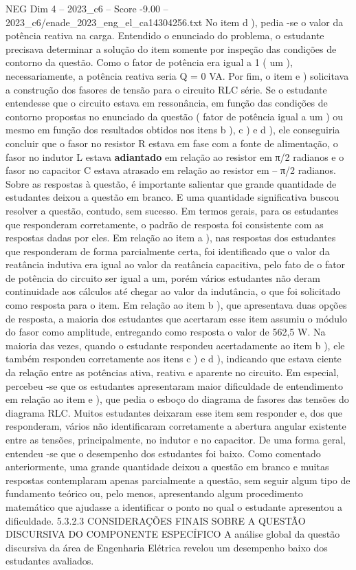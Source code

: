 \begin{textsample}{NEG Dim 4 – 2023\_c6 – Score -9.00 – 2023\_c6/enade\_2023\_eng\_el\_ca14304256.txt}
No item d ), pedia -se o valor da potência reativa na carga.
Entendido o enunciado do problema, o estudante precisava determinar a solução do item somente por inspeção das condições de contorno da questão.
Como o fator de potência era igual a 1 ( um ), necessariamente, a potência reativa seria Q = 0 VA.
Por fim, o item e ) solicitava a construção dos fasores de tensão para o circuito RLC série.
Se o estudante entendesse que o circuito estava em ressonância, em função das condições de contorno propostas no enunciado da questão ( fator de potência igual a um ) ou mesmo em função dos resultados obtidos nos itens b ), c ) e d ), ele conseguiria concluir que o fasor no resistor R estava em fase com a fonte de alimentação, o fasor no indutor L estava \textbf{adiantado} em relação ao resistor em π/2 radianos e o fasor no capacitor C estava atrasado em relação ao resistor em – π/2 radianos.
Sobre as respostas à questão, é importante salientar que grande quantidade de estudantes deixou a questão em branco.
E uma quantidade significativa buscou resolver a questão, contudo, sem sucesso.
Em termos gerais, para os estudantes que responderam corretamente, o padrão de resposta foi consistente com as respostas dadas por eles.
Em relação ao item a ), nas respostas dos estudantes que responderam de forma parcialmente certa, foi identificado que o valor da reatância indutiva era igual ao valor da reatância capacitiva, pelo fato de o fator de potência do circuito ser igual a um, porém vários estudantes não deram continuidade aos cálculos até chegar ao valor da indutância, o que foi solicitado como resposta para o item.
Em relação ao item b ), que apresentava duas opções de resposta, a maioria dos estudantes que acertaram esse item assumiu o módulo do fasor como amplitude, entregando como resposta o valor de 562,5 W.
Na maioria das vezes, quando o estudante respondeu acertadamente ao item b ), ele também respondeu corretamente aos itens c ) e d ), indicando que estava ciente da relação entre as potências ativa, reativa e aparente no circuito.
Em especial, percebeu -se que os estudantes apresentaram maior dificuldade de entendimento em relação ao item e ), que pedia o esboço do diagrama de fasores das tensões do diagrama RLC.
Muitos estudantes deixaram esse item sem responder e, dos que responderam, vários não identificaram corretamente a abertura angular existente entre as tensões, principalmente, no indutor e no capacitor.
De uma forma geral, entendeu -se que o desempenho dos estudantes foi baixo.
Como comentado anteriormente, uma grande quantidade deixou a questão em branco e muitas respostas contemplaram apenas parcialmente a questão, sem seguir algum tipo de fundamento teórico ou, pelo menos, apresentando algum procedimento matemático que ajudasse a identificar o ponto no qual o estudante apresentou a dificuldade. 5.3.2.3 CONSIDERAÇÕES FINAIS SOBRE A QUESTÃO DISCURSIVA DO COMPONENTE ESPECÍFICO A análise global da questão discursiva da área de Engenharia Elétrica revelou um desempenho baixo dos estudantes avaliados.

\end{textsample}

